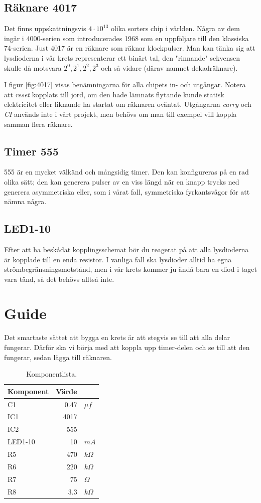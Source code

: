 \documentclass{article}
\begin{document}
\subsection{Räknare 4017}

Det finns uppskattningsvis $4 \cdot 10^{13}$ olika sorters chip i världen. Några av dem ingår i 4000-serien som introducerades 1968 som en uppföljare till den klassiska 74-serien. Just 4017 är en räknare som räknar klockpulser. Man kan tänka sig att lysdioderna i vår krets representerar ett binärt tal, den "rinnande" sekvensen skulle då motsvara $2^0, 2^1, 2^2, 2^3$ och så vidare (därav namnet dekadräknare).

I figur \ref{fig:4017} visas benämningarna för alla chipets in- och utgångar. Notera att \emph{reset} kopplats till jord, om den hade lämnats flytande kunde statisk elektricitet eller liknande ha startat om räknaren oväntat. Utgångarna \emph{carry} och \emph{CI} används inte i vårt projekt, men behövs om man till exempel vill koppla samman flera räknare.

\subsection{Timer 555}
555 är en mycket välkänd och mångsidig timer. Den kan konfigureras på en rad olika sätt; den kan generera pulser av en viss längd när en knapp trycks ned generera asymmetriska eller, som i vårat fall, symmetriska fyrkantsvågor för att nämna några.

\subsection{LED1-10}
Efter att ha beskådat kopplingsschemat bör du reagerat på att alla lysdioderna är kopplade till en enda resistor. I vanliga fall ska lysdioder alltid ha egna strömbegränsningsmotstånd, men i vår krets kommer ju ändå bara en diod i taget vara tänd, så det behövs alltså inte.


\section{Guide}

Det smartaste sättet att bygga en krets är att stegvis se till att alla delar fungerar. Därför ska vi börja med att koppla upp timer-delen och se till att den fungerar, sedan lägga till räknaren.

\begin{table}[h]
\centering
\caption{Komponentlista.}
\label{tab:komp}
\begin{tabular}{l rl}
Komponent & Värde\\
\hline
C1  & 0.47 & $\mu f$\\
IC1 & 4017 & \\
IC2 & 555  & \\
LED1-10 &10&$mA$\\
R5  & 470 & $k\Omega$\\
R6  & 220 & $k\Omega$\\
R7  & 75  & $\Omega$\\
R8  & 3.3 & $k\Omega$\\
\end{tabular}
\end{table}
\end{document}
